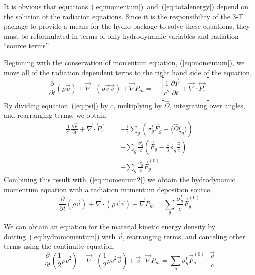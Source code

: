 \documentclass{article}
\newcommand{\partl}[2]{\ensuremath{\frac{\partial{#1}}{\partial{#2}}}}\newcommand{\del}{\ensuremath{\vec{\nabla}}}
\newcommand{\tensor}[1]{\ensuremath{\stackrel{\leftrightarrow}{#1}}}
\begin{document}
It is obvious that equations~(\ref{eq:momentum})~and~(\ref{eq:totalenergy})
depend on the solution of the radiation equations.
Since it is the responsibility of the 3-T package to provide a means for
the hydro package to solve these equations, they must be reformulated
in terms of only hydrodynamic variables and radiation ``source terms''.

Beginning with the conservation of momentum equation, (\ref{eq:momentum}),
we move all of the radiation dependent terms to the right hand side of the
equation,
\begin{equation}
   \partl{}{t}\left( \rho \vec{v}\right)
      + \del \cdot \left( \rho \vec{v} \vec{v} \right)
      + \del P_{m}
   =
   - \left[ \frac{1}{c^2} \partl{\vec{F}}{t}
            + \del \cdot \tensor{P_{r}}
     \right]
\label{eq:momentum2}
\end{equation}
By dividing equation~(\ref{eq:psi}) by $c$, multiplying by $\hat{\Omega}$,
integrating over angles, and rearranging terms, we obtain
\begin{eqnarray}
   \frac{1}{c^2} \partl{\vec{F}}{t} + \del \cdot \tensor{P_{r}}
      &=& - \frac{1}{c} \sum_{g} \left( \sigma^{t}_{g} \vec{F}_{g}
                              - \langle \hat{\Omega} \xi_{g} \rangle \right)
         \\
      &=& - \sum_{g} \frac{\sigma^{t}_{g}}{c}
             \left( \vec{F}_{g} - \frac{4}{3} \phi_{g} \frac{\vec{v}}{c} \right)
         \\
      &=& - \sum_{g} \frac{\sigma^{t}_{g}}{c} \vec{F}^{(0)}_{g}
\end{eqnarray}
Combining this result with~(\ref{eq:momentum2}) we obtain the hydrodynamic
momentum equation with a radiation momentum deposition source,
\begin{equation}
 \boxed{
   \partl{}{t}\left( \rho \vec{v}\right)
      + \del \cdot \left( \rho \vec{v} \vec{v} \right)
      + \del P_{m}
   =
    \sum_{g} \frac{\sigma^{t}_{g}}{c} \vec{F}^{(0)}_{g}
 }
\label{eq:hydromomentum}
\end{equation}

We can obtain an equation for the material kinetic energy density by
dotting~(\ref{eq:hydromomentum}) with $\vec{v}$, rearranging terms, and
canceling other terms using the continuity equation,
\begin{equation}
     \partl{}{t} \left(\frac{1}{2} \rho v^2\right)
   + \del \cdot \left(\frac{1}{2} \rho v^2 \vec{v} \right)
   + \vec{v} \cdot \del P_{m}
   = \sum_{g} \sigma^{t}_{g} \vec{F}^{(0)}_{g} \cdot \frac{\vec{v}}{c}
\label{eq:hydrokinetic}
\end{equation}
\end{document}
